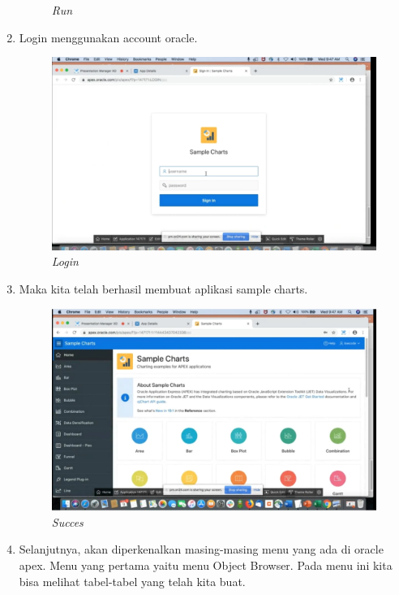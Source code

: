\begin{enumerate}
\begin{figure}[H]
    \caption{\textit{Run}}
    \label{foto8}
\end{figure}
 \item Login menggunakan account oracle.
 \begin{figure}[H]
    \centering
    \includegraphics[scale=0.5]{figures/i}
    \caption{\textit{Login}}
    \label{foto9}
\end{figure}
\item Maka kita telah berhasil membuat aplikasi sample charts.
 \begin{figure}[H]
    \centering
    \includegraphics[scale=0.5]{figures/j}
    \caption{\textit{Succes}}
    \label{foto10}
\end{figure}
 \item Selanjutnya, akan diperkenalkan masing-masing menu yang ada di oracle apex. Menu yang pertama yaitu menu Object Browser. Pada menu ini kita bisa melihat tabel-tabel yang telah kita buat.
 \begin{figure}[H]
    \centering

\end{figure}
\end{enumerate}
